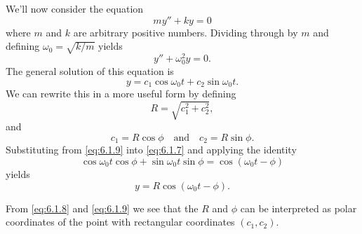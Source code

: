 \documentclass{ximera}
\begin{document}
\begin{example}
\begin{explanation}
\begin{center}
\end{center}

\end{explanation}
\end{example}
 
We'll now consider the equation
$$
my''+ky=0
$$
where $m$ and $k$ are arbitrary positive numbers. Dividing through by
$m$ and defining $\omega_0=\sqrt{k/m}$ yields
$$
y''+\omega_0^2y=0.
$$
The general solution of this equation is
\begin{equation}\label{eq:6.1.7}
y=c_1\cos\omega_0t+c_2\sin\omega_0t.
\end{equation}
We can rewrite this in a more useful form by defining
\begin{equation}\label{eq:6.1.8}
R=\sqrt{c_1^2+c_2^2},
\end{equation}
and
\begin{equation}\label{eq:6.1.9}
c_1=R\cos\phi\quad\mbox{and}\quad c_2=R\sin\phi.
\end{equation}
Substituting from \eqref{eq:6.1.9} into \eqref{eq:6.1.7} and applying the
identity
$$
\cos\omega_0t\cos\phi+\sin\omega_0t\sin\phi=\cos(\omega_0t-\phi)
$$
yields
\begin{equation}\label{eq:6.1.10}
y=R\cos(\omega_0t-\phi).
\end{equation}
 
From \eqref{eq:6.1.8} and \eqref{eq:6.1.9} we see that the $R$ and $\phi$
can be interpreted as polar coordinates of the point with rectangular
coordinates $(c_1,c_2)$.
\end{document}
